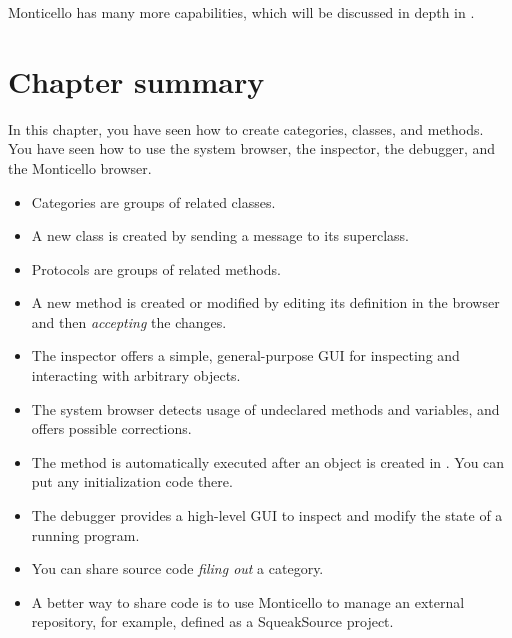 \documentclass[a4paper,10pt,twoside]{book}
\begin{document}
Monticello has many more capabilities, which will be discussed in depth in .

\section{Chapter summary}
In this chapter, you have seen how to create categories, classes, and methods.
You have seen how to use the system browser, the inspector, the debugger, and the Monticello browser.

\begin{itemize}
  \item Categories are groups of related classes.
  \item A new class is created by sending a message to its superclass.
  \item Protocols are groups of related methods.
  \item A new method is created or modified by editing its definition in the browser and then \emph{accepting} the changes.
  \item The inspector offers a simple, general-purpose GUI for inspecting and interacting with arbitrary objects.
  \item The system browser detects usage of undeclared methods and variables, and offers possible corrections.
  \item The  method is automatically executed after an object is created in \squeak.
  You can put any initialization code there.
  \item The debugger provides a high-level GUI to inspect and modify the state of a running program.
  \item You can share source code \emph{filing out} a category.
  \item A better way to share code is to use Monticello to manage an external repository, for example, defined as a SqueakSource project.
\end{itemize}

\ifx\wholebook\relax\else
\end{document}
